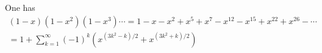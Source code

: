 \begin{thm}[Euler]
\label{thm:EulerPenta}
One has
\begin{multline*}
(1-x)(1-x^2)(1-x^3) \cdots = 1 - x - x^2 + x^5 + x^7 - x^{12} - x^{15} + x^{22} + x^{26} - \cdots\\
= 1 + \sum_{k=1}^{\infty} (-1)^k (x^{(3k^2-k)/2} + x^{(3k^2+k)/2})
\end{multline*}
\end{thm}